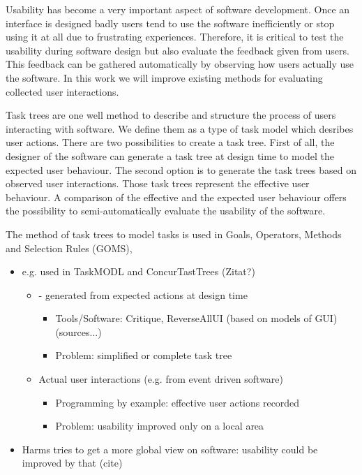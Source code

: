 Usability has become a very important aspect of software development. 
Once an interface is designed badly users tend to use the software inefficiently or stop using it at all due to frustrating experiences.
Therefore, it is critical to test the usability during software design but also evaluate the feedback given from users. 
This feedback can be gathered automatically by observing how users actually use the software.
In this work we will improve existing methods for evaluating collected user interactions.

Task trees are one well method to describe and structure the process of users interacting with software. 
We define them as a type of task model which desribes user actions. There are two possibilities to create a task tree.
First of all, the designer of the software can generate a task tree at design time to model the expected user behaviour\cite{harms2013}.
The second option is to generate the task trees based on observed user interactions. 
Those task trees represent the effective user behaviour.
A comparison of the effective and the expected user behaviour offers the possibility to semi-automatically evaluate the usability of the software.  

The method of task trees to model tasks is used in Goals, Operators, Methods and Selection Rules (GOMS),


\begin{itemize}
	\item  e.g. used in TaskMODL and ConcurTastTrees (Zitat?)
 	\begin{itemize}
		\item - generated from expected actions at design time
      		\begin{itemize}
			\item Tools/Software: Critique, ReverseAllUI (based on models of GUI) (sources...)
     			\item Problem: simplified or complete task tree
		\end{itemize}
		\item Actual user interactions (e.g. from event driven software)
     		\begin{itemize} 
			\item Programming by example: effective user actions recorded
			\item Problem: usability improved only on a local area
		\end{itemize}
	\end{itemize}
	\item Harms tries to get a more global view on software: usability could be improved by that (cite) 
\end{itemize}


